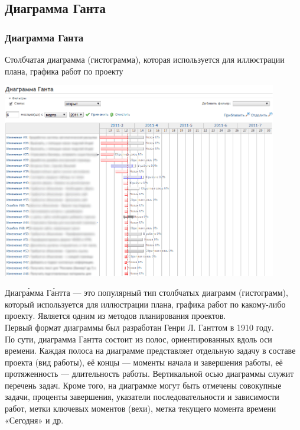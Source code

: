\documentclass{../industrial-development}
\begin{document}
\subsection{Диаграмма Ганта}
\begin{frame} \frametitle{Диаграмма Ганта}
Столбчатая диаграмма (гистограмма), которая используется для иллюстрации плана, графика работ по проекту
\centerline{\includegraphics[width=0.9\textwidth]{gantt.png}}
\end{frame}
\lecturenotes
Диагра́мма Га́нтта — это популярный тип столбчатых диаграмм (гистограмм), который используется для иллюстрации плана, графика работ по какому-либо проекту. Является одним из методов планирования проектов.\\
Первый формат диаграммы был разработан Генри Л. Ганттом в 1910 году.\\
По сути, диаграмма Гантта состоит из полос, ориентированных вдоль оси времени. Каждая полоса на диаграмме представляет отдельную задачу в составе проекта (вид работы), её концы — моменты начала и завершения работы, её протяженность — длительность работы. Вертикальной осью диаграммы служит перечень задач. Кроме того, на диаграмме могут быть отмечены совокупные задачи, проценты завершения, указатели последовательности и зависимости работ, метки ключевых моментов (вехи), метка текущего момента времени «Сегодня» и др.
\end{document}
